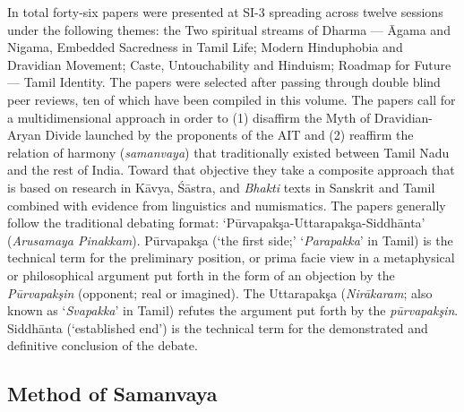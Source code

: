 In total forty-six papers were presented at SI-3 spreading across twelve sessions under the following themes: the Two spiritual streams of Dharma — Āgama and Nigama, Embedded Sacredness in Tamil Life; Modern Hinduphobia and Dravidian Movement; Caste, Untouchability and Hinduism; Roadmap for Future — Tamil Identity. The papers were selected after passing through double blind peer reviews, ten of which have been compiled in this volume. The papers call for a multidimensional approach in order to (1) disaffirm the Myth of Dravidian-Aryan Divide launched by the proponents of the AIT and (2) reaffirm the relation of harmony (\textit{samanvaya}) that traditionally existed between Tamil Nadu and the rest of India. Toward that objective they take a composite approach that is based on research in Kāvya, Śāstra, and \textit{Bhakti} texts in Sanskrit and Tamil combined with evidence from linguistics and numismatics. The papers generally follow the traditional debating format: ‘Pūrvapakşa-Uttarapakşa-Siddhānta’ (\textit{Arusamaya Pinakkam}). Pūrvapakşa (‘the first side;’ ‘\textit{Parapakka}’ in Tamil) is the technical term for the preliminary position, or prima facie view in a metaphysical or philosophical argument put forth in the form of an objection by the \textit{Pūrvapakşin} (opponent; real or imagined). The Uttarapakşa (\textit{Nirākaram}; also known as ‘\textit{Svapakka}’ in Tamil) refutes the argument put forth by the \textit{pūrvapakşin}. Siddhānta (‘established end’) is the technical term for the demonstrated and definitive conclusion of the debate.

\subsection*{Method of Samanvaya}

